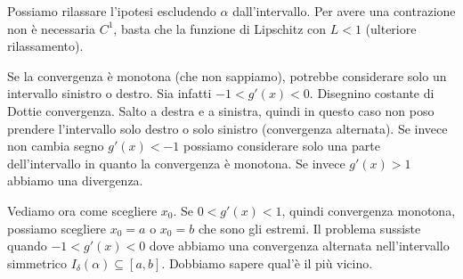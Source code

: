 \documentclass[a4paper]{article}
\begin{document}
Possiamo rilassare l'ipotesi escludendo \(\alpha\) dall'intervallo.
Per avere una contrazione non è necessaria \(C^1\), basta che la funzione di Lipschitz con \(L<1\)
(ulteriore rilassamento).

Se la convergenza è monotona (che non sappiamo), potrebbe considerare solo un intervallo
sinistro o destro. Sia infatti \(-1 < g'(x) < 0\).
Disegnino costante di Dottie convergenza. Salto a destra e a sinistra, quindi in questo caso
non poso prendere l'intervallo solo destro o solo sinistro (convergenza alternata).
Se invece non cambia segno \(g'(x) < -1\) possiamo considerare solo una parte dell'intervallo
in quanto la convergenza è monotona.
Se invece \(g'(x)>1\) abbiamo una divergenza.

Vediamo ora come scegliere \(x_0\). Se \(0 < g'(x) < 1\), quindi convergenza monotona,
possiamo scegliere \(x_0 = a\) o \(x_0 = b\) che sono gli estremi.
Il problema sussiste quando \(-1 < g'(x) < 0\) dove abbiamo una convergenza alternata
nell'intervallo simmetrico \(I_\delta(\alpha) \subseteq [a,b]\). Dobbiamo sapere qual'è il più vicino.


\end{document}
